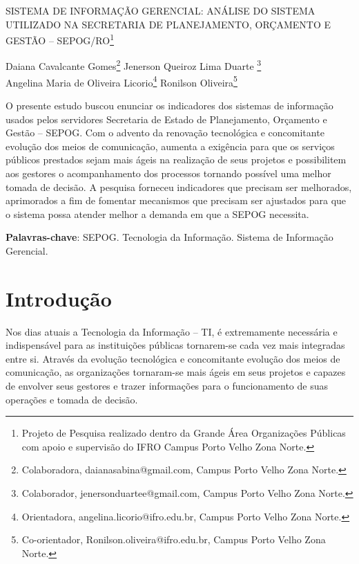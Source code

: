 \documentclass[article,12pt,onesidea,4paper,english,brazil]{abntex2}
\begin{document}
	
	
	\frenchspacing 
	
	\begin{center}
		\LARGE SISTEMA DE INFORMAÇÃO GERENCIAL: \MakeUppercase{Análise do sistema utilizado na Secretaria de Planejamento, Orçamento e Gestão – SEPOG/RO}\footnote{Projeto de Pesquisa realizado dentro da Grande Área Organizações Públicas com apoio e supervisão do IFRO Campus Porto Velho Zona Norte.}
		
		\normalsize
	Daiana Cavalcante Gomes\footnote{Colaboradora, daianasabina@gmail.com, Campus Porto Velho Zona Norte.} 
	Jenerson Queiroz Lima Duarte \footnote{Colaborador, jenersonduartee@gmail.com, Campus Porto Velho Zona Norte.} \\
	Angelina Maria de Oliveira Licorio\footnote{Orientadora, angelina.licorio@ifro.edu.br, Campus Porto Velho Zona Norte.} 
	Ronilson Oliveira\footnote{Co-orientador, Ronilson.oliveira@ifro.edu.br, Campus Porto Velho Zona Norte.} 
	\end{center}
	
	\begin{resumoumacoluna}
		O presente estudo buscou enunciar os indicadores dos sistemas de informação usados pelos servidores Secretaria de Estado de Planejamento, Orçamento e Gestão – SEPOG. Com o advento da renovação tecnológica e concomitante evolução dos meios de comunicação, aumenta a exigência para que os serviços públicos prestados sejam mais ágeis na realização de seus projetos e possibilitem aos gestores o acompanhamento dos processos tornando possível uma melhor tomada de decisão. A pesquisa forneceu indicadores que precisam ser melhorados, aprimorados a fim de fomentar mecanismos que precisam ser ajustados para que o sistema possa atender melhor a demanda em que a SEPOG necessita.
		
		\vspace{\onelineskip}
		
		\noindent
		\textbf{Palavras-chave}: SEPOG. Tecnologia da Informação. Sistema de Informação Gerencial.
	\end{resumoumacoluna}	
	
	\section*{Introdução}
	
	Nos dias atuais a Tecnologia da Informação – TI, é extremamente necessária e indispensável para as instituições públicas tornarem-se cada vez mais integradas entre si. Através da evolução tecnológica e concomitante evolução dos meios de comunicação, as organizações tornaram-se mais ágeis em seus projetos e capazes de envolver seus gestores e trazer informações para o funcionamento de suas operações e tomada de decisão.
	
\end{document}
